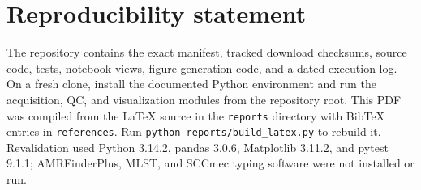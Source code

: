 \documentclass[11pt,a4paper]{article}
\begin{document}
\section*{Reproducibility statement}
The repository contains the exact manifest, tracked download checksums, source code, tests, notebook views, figure-generation code, and a dated execution log. On a fresh clone, install the documented Python environment and run the acquisition, QC, and visualization modules from the repository root. This PDF was compiled from the LaTeX source in the \texttt{reports} directory with BibTeX entries in \texttt{references}. Run \texttt{python reports/build\_latex.py} to rebuild it. Revalidation used Python 3.14.2, pandas 3.0.6, Matplotlib 3.11.2, and pytest 9.1.1; AMRFinderPlus, MLST, and SCCmec typing software were not installed or run.



\end{document}

